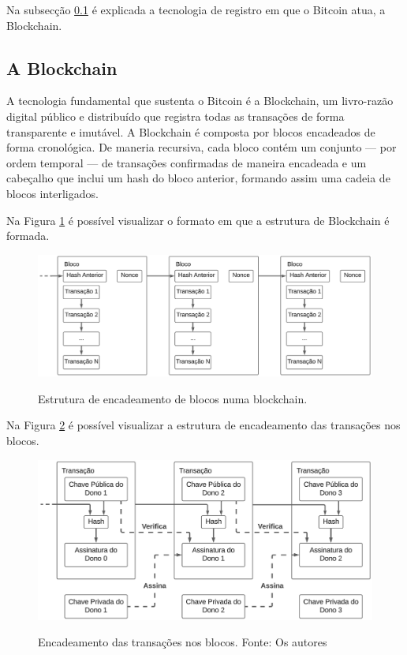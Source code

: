 Na subsecção \ref*{subsec:blockchain} é explicada a tecnologia de registro em que o Bitcoin atua, a Blockchain.

\subsection{A Blockchain} \label{subsec:blockchain}
A tecnologia fundamental que sustenta o Bitcoin é a Blockchain, um livro-razão digital público e distribuído que registra todas as transações de forma transparente e imutável. A Blockchain é composta por blocos encadeados de forma cronológica. De maneria recursiva, cada bloco contém um conjunto — por ordem temporal — de transações confirmadas de maneira encadeada e um cabeçalho que inclui um hash do bloco anterior, formando assim uma cadeia de blocos interligados.

Na Figura \ref*{fig:blockchain} é possível visualizar o formato em que a estrutura de Blockchain é formada.

\begin{figure} [h]
    \centering
        \caption{Estrutura de encadeamento de blocos numa blockchain.}
        \includegraphics[width=.8\linewidth]{images/figura 2.png}
        \label{fig:blockchain}
\end{figure}

Na Figura \ref*{fig:transactions} é possível visualizar a estrutura de encadeamento das transações nos blocos.

\begin{figure} [h]
    \centering
        \caption{Encadeamento das transações nos blocos. Fonte: Os autores}
        \includegraphics[width=.8\linewidth]{images/figura 1.png}
        \label{fig:transactions}

\end{figure} 

